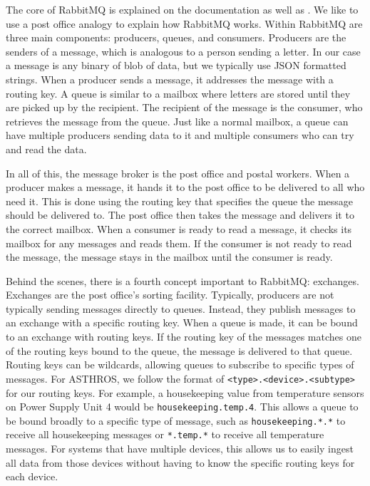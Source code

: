 The core of RabbitMQ is explained on the documentation as well as \cite{toshev2015learning}.
We like to use a post office analogy to explain how RabbitMQ works.
Within RabbitMQ are three main components: producers, queues, and consumers. 
Producers are the senders of a message, which is analogous to a person sending a letter.
In our case a message is any binary of blob of data, but we typically use JSON formatted strings.
When a producer sends a message, it addresses the message with a routing key.
A queue is similar to a mailbox where letters are stored until they are picked up by the recipient.
The recipient of the message is the consumer, who retrieves the message from the queue.
Just like a normal mailbox, a queue can have multiple producers sending data to it and multiple consumers who can try and read the data.

In all of this, the message broker is the post office and postal workers.
When a producer makes a message, it hands it to the post office to be delivered to all who need it.
This is done using the routing key that specifies the queue the message should be delivered to.
The post office then takes the message and delivers it to the correct mailbox. 
When a consumer is ready to read a message, it checks its mailbox for any messages and reads them.
If the consumer is not ready to read the message, the message stays in the mailbox until the consumer is ready.

Behind the scenes, there is a fourth concept important to RabbitMQ: exchanges.
Exchanges are the post office's sorting facility.
Typically, producers are not typically sending messages directly to queues. 
Instead, they publish messages to an exchange with a specific routing key.
When a queue is made, it can be bound to an exchange with routing keys.
If the routing key of the messages matches one of the routing keys bound to the queue, the message is delivered to that queue.
Routing keys can be wildcards, allowing queues to subscribe to specific types of messages. 
For ASTHROS, we follow the format of \texttt{<type>.<device>.<subtype>} for our routing keys.
For example, a housekeeping value from temperature sensors on Power Supply Unit 4 would be \texttt{housekeeping.temp.4}.
This allows a queue to be bound broadly to a specific type of message, such as \texttt{housekeeping.*.*} to receive all housekeeping messages or \texttt{*.temp.*} to receive all temperature messages.
For systems that have multiple devices, this allows us to easily ingest all data from those devices without having to know the specific routing keys for each device.


